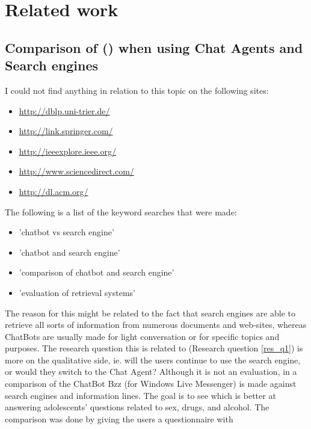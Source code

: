 \chapter{Related work}
\label{chapter3:related_work}


\section{Comparison of  () when using Chat Agents and Search engines}
\label{chapter3:chatbot_vs_search_engine}
I could not find anything in relation to this topic on the following sites:
\begin{itemize}
	\item \url{http://dblp.uni-trier.de/}
	\item \url{http://link.springer.com/}
	\item \url{http://ieeexplore.ieee.org/}
	\item \url{http://www.sciencedirect.com/}
	\item \url{http://dl.acm.org/}
\end{itemize}
The following is a list of the keyword searches that were made:
\begin{itemize}
	\item 'chatbot vs search engine'
	\item 'chatbot and search engine'
	\item 'comparison of chatbot and search engine'
	\item 'evaluation of retrieval systems' 
\end{itemize}
The reason for this might be related to the fact that search engines are able to retrieve all sorts of information from numerous documents and web-sites, whereas 
ChatBots are usually made for light conversation or for specific topics and purposes. The research question this is related to (Research question \ref{res_q1}) 
is more on the qualitative side, ie. will the users continue to use the search engine, or would they switch to the Chat Agent?
\vspace{0.5em}\newline
Although it is not an evaluation, in \citet{Crutzen2011} a comparison of the ChatBot Bzz (for Windows Live Messenger) is made against search engines and information lines. 
The goal is to see which is better at answering adolescents' questions related to sex, drugs, and alcohol. The comparison was done by giving the users a questionnaire with 
